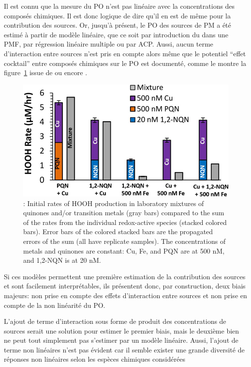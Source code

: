 Il est connu que la mesure du PO n'est pas linéaire avec la concentrations des composés
chimiques. Il est donc logique de dire qu'il en est de même pour la contribution des
sources.
Or, jusqu'à présent, le PO des sources de PM a été estimé à partir de modèle linéaire,
que ce soit par introduction du \POv{} dans une PMF, par régression linéaire multiple ou
par ACP.
Aussi, aucun terme d'interaction entre sources n'est pris en compte alors même que
le potentiel ``effet cocktail'' entre composés chimiques sur le PO est documenté, comme le
montre la figure~\ref{fig:charrier_hydrogen_2014_fig4} issue de
\cite{charrierHydrogen2014} ou encore 
\cites[figure S7 du supplément]{charrierDithiothreitol2012}{xiongRethinking2017}{samakeUnexpected2017}.

\begin{figure}[ht]
    \centering
    \includegraphics[width=0.5\linewidth]{figures/chapter05/charrier_hydrogen_2014_fig4.jpg}
    \caption{\cite[figure 4]{charrierHydrogen2014}: Initial rates of HOOH production in
    laboratory mixtures of quinones and/or transition metals (gray bars) compared to the
    sum of the rates from the individual redox-active species (stacked colored bars). Error
    bars of the colored stacked bars are the propagated errors of the sum (all have replicate
    samples). The concentrations of metals and quinones are constant: Cu, Fe, and PQN are at
    500 nM, and 1,2-NQN is at 20 nM.}%
    \label{fig:charrier_hydrogen_2014_fig4}
\end{figure}

Si ces modèles permettent une première estimation de la contribution des sources et sont
facilement interprétables, ils présentent donc, par construction, deux biais majeurs: non
prise en compte des effets d'interaction entre sources et non prise en compte de la non
linéarité du PO.

L'ajout de terme d'interaction sous forme de produit des concentrations de sources serait
une solution pour estimer le premier biais, mais le deuxième bien ne peut tout simplement
pas s'estimer par un modèle linéaire. Aussi, l'ajout de terme non linéaires n'est pas
évident car il semble exister une grande diversité de réponses non linéaires selon les
espèces chimiques
considérées~\autocite{charrierDithiothreitol2012,charrierBias2016,calasImportance2017}

